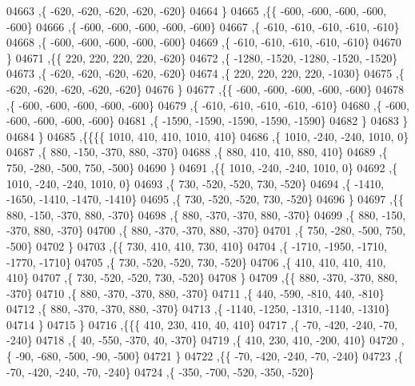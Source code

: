 \begin{DoxyCode}
04663     ,\{  -620,  -620,  -620,  -620,  -620\}
04664     \}
04665    ,\{\{  -600,  -600,  -600,  -600,  -600\}
04666     ,\{  -600,  -600,  -600,  -600,  -600\}
04667     ,\{  -610,  -610,  -610,  -610,  -610\}
04668     ,\{  -600,  -600,  -600,  -600,  -600\}
04669     ,\{  -610,  -610,  -610,  -610,  -610\}
04670     \}
04671    ,\{\{   220,   220,   220,   220,  -620\}
04672     ,\{ -1280, -1520, -1280, -1520, -1520\}
04673     ,\{  -620,  -620,  -620,  -620,  -620\}
04674     ,\{   220,   220,   220,   220, -1030\}
04675     ,\{  -620,  -620,  -620,  -620,  -620\}
04676     \}
04677    ,\{\{  -600,  -600,  -600,  -600,  -600\}
04678     ,\{  -600,  -600,  -600,  -600,  -600\}
04679     ,\{  -610,  -610,  -610,  -610,  -610\}
04680     ,\{  -600,  -600,  -600,  -600,  -600\}
04681     ,\{ -1590, -1590, -1590, -1590, -1590\}
04682     \}
04683    \}
04684   \}
04685  ,\{\{\{\{  1010,   410,   410,  1010,   410\}
04686     ,\{  1010,  -240,  -240,  1010,     0\}
04687     ,\{   880,  -150,  -370,   880,  -370\}
04688     ,\{   880,   410,   410,   880,   410\}
04689     ,\{   750,  -280,  -500,   750,  -500\}
04690     \}
04691    ,\{\{  1010,  -240,  -240,  1010,     0\}
04692     ,\{  1010,  -240,  -240,  1010,     0\}
04693     ,\{   730,  -520,  -520,   730,  -520\}
04694     ,\{ -1410, -1650, -1410, -1470, -1410\}
04695     ,\{   730,  -520,  -520,   730,  -520\}
04696     \}
04697    ,\{\{   880,  -150,  -370,   880,  -370\}
04698     ,\{   880,  -370,  -370,   880,  -370\}
04699     ,\{   880,  -150,  -370,   880,  -370\}
04700     ,\{   880,  -370,  -370,   880,  -370\}
04701     ,\{   750,  -280,  -500,   750,  -500\}
04702     \}
04703    ,\{\{   730,   410,   410,   730,   410\}
04704     ,\{ -1710, -1950, -1710, -1770, -1710\}
04705     ,\{   730,  -520,  -520,   730,  -520\}
04706     ,\{   410,   410,   410,   410,   410\}
04707     ,\{   730,  -520,  -520,   730,  -520\}
04708     \}
04709    ,\{\{   880,  -370,  -370,   880,  -370\}
04710     ,\{   880,  -370,  -370,   880,  -370\}
04711     ,\{   440,  -590,  -810,   440,  -810\}
04712     ,\{   880,  -370,  -370,   880,  -370\}
04713     ,\{ -1140, -1250, -1310, -1140, -1310\}
04714     \}
04715    \}
04716   ,\{\{\{   410,   230,   410,    40,   410\}
04717     ,\{   -70,  -420,  -240,   -70,  -240\}
04718     ,\{    40,  -550,  -370,    40,  -370\}
04719     ,\{   410,   230,   410,  -200,   410\}
04720     ,\{   -90,  -680,  -500,   -90,  -500\}
04721     \}
04722    ,\{\{   -70,  -420,  -240,   -70,  -240\}
04723     ,\{   -70,  -420,  -240,   -70,  -240\}
04724     ,\{  -350,  -700,  -520,  -350,  -520\}

\end{DoxyCode}
